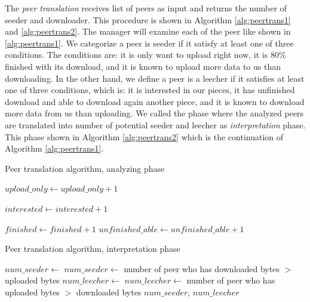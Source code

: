 The \textit{peer translation} receives list of peers as input and returns the number of seeder and downloader. This procedure is shown in Algorithm \ref{alg:peertrans1} and \ref{alg:peertrans2}. The manager will examine each of the peer like shown in \ref{alg:peertrans1}. We categorize a peer is seeder if it satisfy at least one of three conditions. The conditions are: it is only want to upload right now, it is 80\% finished with its download, and it is known to upload more data to us than downloading. In the other hand, we define a peer is a leecher if it satisfies at least one of three conditions, which is: it is interested in our pieces, it has unfinished download and able to download again another piece, and it is known to download more data from us than uploading. We called the phase where the analyzed peers are translated into number of potential seeder and leecher as \textit{interpretation} phase. This phase shown in Algorithm \ref{alg:peertrans2} which is the continuation of Algorithm \ref{alg:peertrans1}.

\begin{algorithm}[]
	\caption{Peer translation algorithm, analyzing phase}
	\label{alg:peertrans1}
	\begin{algorithmic}[1]
		\Statex
			\State $upload\_only \gets upload\_only + 1$
			\EndIf	
			
			\State $interested \gets interested + 1$
			\EndIf	
			
			\State $finished \gets finished + 1$
			\Else
			\State $unfinished\_able \gets unfinished\_able + 1$
			\EndIf	
			\EndIf
		\EndFor
	\end{algorithmic}
\end{algorithm}

\begin{algorithm}[]
	\caption{Peer translation algorithm, interpretation phase}
	\label{alg:peertrans2}
	\begin{algorithmic}[1]
		\State $num\_seeder \gets $ 
		\State $num\_seeder \gets $ number of peer who has downloaded bytes $>$ uploaded bytes
		\EndIf
		\State $num\_leecher \gets $ 
		\State $num\_leecher \gets $ number of peer who has uploaded bytes $>$ downloaded bytes
		\EndIf
		\State \Return $num\_seeder$, $num\_leecher$
	\EndFunction
	\end{algorithmic}
\end{algorithm}

